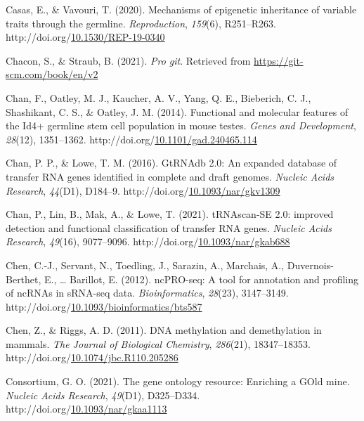 \documentclass[12pt,twoside]{reedthesis}
\newlength{\cslhangindent}
\newenvironment{CSLReferences}[2] %
 {%
  \setlength{\parindent}{0pt}
  \ifodd #1 \everypar{\setlength{\hangindent}{\cslhangindent}}\ignorespaces\fi
  \ifnum #2 > 0
  \setlength{\parskip}{#2\baselineskip}
  \fi
 }%
 {}
\begin{document}
\begin{CSLReferences}{1}{0}
\leavevmode{}%
Casas, E., \& Vavouri, T. (2020). Mechanisms of epigenetic inheritance of variable traits through the germline. \emph{Reproduction}, \emph{159}(6), R251--R263. http://doi.org/\href{https://doi.org/10.1530/REP-19-0340}{10.1530/REP-19-0340}

\leavevmode{}%
Chacon, S., \& Straub, B. (2021). \emph{Pro git}. Retrieved from \url{https://git-scm.com/book/en/v2}

\leavevmode{}%
Chan, F., Oatley, M. J., Kaucher, A. V., Yang, Q. E., Bieberich, C. J., Shashikant, C. S., \& Oatley, J. M. (2014). Functional and molecular features of the Id4+ germline stem cell population in mouse testes. \emph{Genes and Development}, \emph{28}(12), 1351--1362. http://doi.org/\href{https://doi.org/10.1101/gad.240465.114}{10.1101/gad.240465.114}

\leavevmode{}%
Chan, P. P., \& Lowe, T. M. (2016). GtRNAdb 2.0: An expanded database of transfer RNA genes identified in complete and draft genomes. \emph{Nucleic Acids Research}, \emph{44}(D1), D184--9. http://doi.org/\href{https://doi.org/10.1093/nar/gkv1309}{10.1093/nar/gkv1309}

\leavevmode{}%
Chan, P., Lin, B., Mak, A., \& Lowe, T. (2021). tRNAscan-SE 2.0: improved detection and functional classification of transfer RNA genes. \emph{Nucleic Acids Research}, \emph{49}(16), 9077--9096. http://doi.org/\href{https://doi.org/10.1093/nar/gkab688}{10.1093/nar/gkab688}

\leavevmode{}%
Chen, C.-J., Servant, N., Toedling, J., Sarazin, A., Marchais, A., Duvernois-Berthet, E., \ldots{} Barillot, E. (2012). ncPRO-seq: A tool for annotation and profiling of ncRNAs in sRNA-seq data. \emph{Bioinformatics}, \emph{28}(23), 3147--3149. http://doi.org/\href{https://doi.org/10.1093/bioinformatics/bts587}{10.1093/bioinformatics/bts587}

\leavevmode{}%
Chen, Z., \& Riggs, A. D. (2011). DNA methylation and demethylation in mammals. \emph{The Journal of Biological Chemistry}, \emph{286}(21), 18347--18353. http://doi.org/\href{https://doi.org/10.1074/jbc.R110.205286}{10.1074/jbc.R110.205286}

\leavevmode{}%
Consortium, G. O. (2021). The gene ontology resource: Enriching a GOld mine. \emph{Nucleic Acids Research}, \emph{49}(D1), D325--D334. http://doi.org/\href{https://doi.org/10.1093/nar/gkaa1113}{10.1093/nar/gkaa1113}


\end{CSLReferences}
\end{document}
